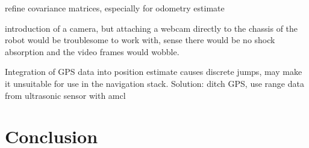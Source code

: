 refine covariance matrices, especially for odometry estimate

introduction of a camera, but attaching a webcam directly to the chassis of the robot would be troublesome to work with, sense there would be no shock absorption and the video frames would wobble.

Integration of GPS data into position estimate causes discrete jumps, may make it unsuitable for use in the navigation stack. Solution: ditch GPS, use range data from ultrasonic sensor with amcl


\section{Conclusion}
